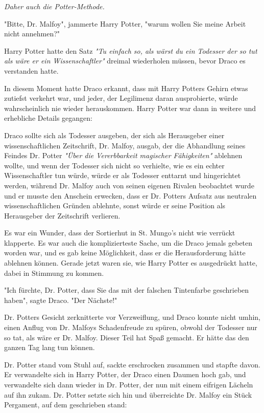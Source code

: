 {\emph{Daher auch die Potter-Methode.}

"Bitte, Dr. Malfoy", jammerte Harry Potter, "warum wollen Sie meine Arbeit nicht annehmen?"

Harry Potter hatte den Satz \emph{"Tu einfach so, als wärst du ein Todesser der so tut als wäre er ein Wissenschaftler"} dreimal wiederholen müssen, bevor Draco es verstanden hatte.

In diesem Moment hatte Draco erkannt, dass mit Harry Potters Gehirn etwas zutiefst verkehrt war, und jeder, der Legilimenz daran ausprobierte, würde wahrscheinlich nie wieder herauskommen. Harry Potter war dann in weitere und erhebliche Details gegangen:

Draco sollte sich als Todesser ausgeben, der sich als Herausgeber einer wissenschaftlichen Zeitschrift, Dr. Malfoy, ausgab, der die Abhandlung seines Feindes Dr. Potter \emph{"Über die Vererbbarkeit magischer Fähigkeiten"} ablehnen wollte, und wenn der Todesser sich nicht so verhielte, wie es ein echter Wissenschaftler tun würde, würde er als Todesser enttarnt und hingerichtet werden, während Dr. Malfoy auch von seinen eigenen Rivalen beobachtet wurde und er musste den Anschein erwecken, dass er Dr. Potters Aufsatz aus neutralen wissenschaftlichen Gründen ablehnte, sonst würde er seine Position als Herausgeber der Zeitschrift verlieren.

Es war ein Wunder, dass der Sortierhut in St. Mungo's nicht wie verrückt klapperte. Es war auch die komplizierteste Sache, um die Draco jemals gebeten worden war, und es gab keine Möglichkeit, dass er die Herausforderung hätte ablehnen können. Gerade jetzt waren sie, wie Harry Potter es ausgedrückt hatte, dabei in Stimmung zu kommen.

"Ich fürchte, Dr. Potter, dass Sie das mit der falschen Tintenfarbe geschrieben haben", sagte Draco. "Der Nächste!"

Dr. Potters Gesicht zerknitterte vor Verzweiflung, und Draco konnte nicht umhin, einen Anflug von Dr. Malfoys Schadenfreude zu spüren, obwohl der Todesser nur so tat, als wäre er Dr. Malfoy. Dieser Teil hat Spaß gemacht. Er hätte das den ganzen Tag lang tun können.

Dr. Potter stand vom Stuhl auf, sackte erschrocken zusammen und stapfte davon. Er verwandelte sich in Harry Potter, der Draco einen Daumen hoch gab, und verwandelte sich dann wieder in Dr. Potter, der nun mit einem eifrigen Lächeln auf ihn zukam. Dr. Potter setzte sich hin und überreichte Dr. Malfoy ein Stück Pergament, auf dem geschrieben stand:

}
